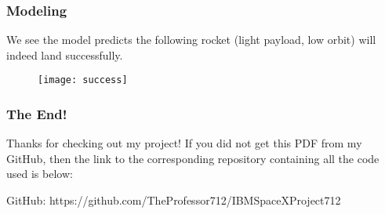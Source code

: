 \documentclass{beamer}
\begin{document}
\begin{frame}

\frametitle{Modeling}

We see the model predicts the following rocket (light payload, low orbit) will indeed land successfully.

\begin{figure}
\texttt{[image: success]}
\end{figure}


\end{frame}



\begin{frame}

\frametitle{The End!}

Thanks for checking out my project! If you did not get this PDF from my GitHub, then the link to the corresponding repository containing all the code used is below:

\bigskip
\bigskip

GitHub: https://github.com/TheProfessor712/IBMSpaceXProject712

\end{frame}


\end{document}
